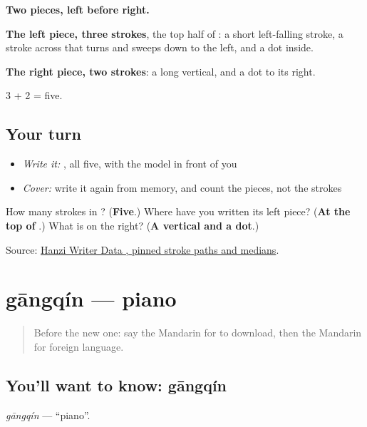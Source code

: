 \begin{quote}
\end{quote}

\textbf{Two pieces, left before right.}

\textbf{The left piece, three strokes}, the top half of : a short left-falling stroke, a stroke across that turns and sweeps down to the left, and a dot inside.

\textbf{The right piece, two strokes}: a long vertical, and a dot to its right.

3 + 2 = five.

\subsection*{Your turn}
\begin{itemize}
\raggedright
  \item \emph{Write it:} , all five, with the model in front of you
  \item \emph{Cover:} write it again from memory, and count the pieces, not the strokes
\end{itemize}

\begin{tcolorbox}[breakable,colback=teal!4,colframe=teal!35!black,title={Before you move on}]
How many strokes in ? (\textbf{Five}.) Where have you written its left piece? (\textbf{At the top of }.) What is on the right? (\textbf{A vertical and a dot}.)

Source: \href{https://raw.githubusercontent.com/chanind/hanzi-writer-data/68d10a4b21150cae5e1ebbd223eed289cf32d90c/data/\%E5\%A4\%96.json}{Hanzi Writer Data , pinned stroke paths and medians}.
\end{tcolorbox}
\section[gāngqín]{gāngqín — piano}

\label{lesson:ZH-C110-gangqin}



\begin{quote}
Before the new one: say the Mandarin for to download, then the Mandarin for foreign language.
\end{quote}

\subsection*{You'll want to know: gāngqín}
\emph{gāngqín} — \textquotedblleft{}piano\textquotedblright{}.

